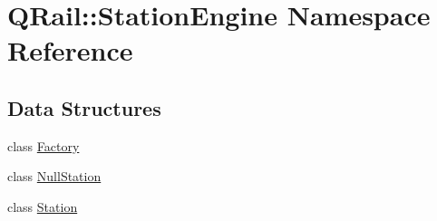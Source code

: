 \hypertarget{namespaceQRail_1_1StationEngine}{}\section{Q\+Rail\+::Station\+Engine Namespace Reference}
\label{namespaceQRail_1_1StationEngine}
\subsection*{Data Structures}
\begin{DoxyCompactItemize}
\item 
class \mbox{\hyperlink{classQRail_1_1StationEngine_1_1Factory}{Factory}}
\item 
class \mbox{\hyperlink{classQRail_1_1StationEngine_1_1NullStation}{Null\+Station}}
\item 
class \mbox{\hyperlink{classQRail_1_1StationEngine_1_1Station}{Station}}
\end{DoxyCompactItemize}
